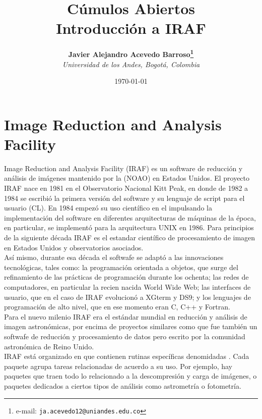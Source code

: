 \documentclass[12pt]{article}
\begin{document}
\title{Cúmulos Abiertos \\ Introducción a IRAF}

\author{
\textbf{Javier Alejandro Acevedo Barroso\thanks{e-mail: \texttt{ja.acevedo12@uniandes.edu.co}}}\\
\textit{Universidad de los Andes, Bogotá, Colombia}\\
 }%

\date{\today}
\maketitle %


\normalsize
\newpage





\section{Image Reduction and Analysis Facility}
Image Reduction and Analysis Facility (IRAF) es un software de reducción y análisis de imágenes mantenido por la  (NOAO) en Estados Unidos. El proyecto IRAF nace en 1981 en el Observatorio Nacional Kitt Peak, en donde de 1982 a 1984 se escribió la primera versión del software y su lenguaje de script para el usuario  (CL). En 1984 empezó su uso científico en el  impulsando la implementación del software en diferentes arquitecturas de máquinas de la época, en particular, se implementó para la arquitectura UNIX en 1986. Para principios de la siguiente década IRAF es el estandar científico de procesamiento de imagen en Estados Unidos y observatorios asociados\cite{IRAFinThe80}. \\
Así mismo, durante esa década el softwafe se adaptó a las innovaciones tecnológicas, tales como: la programación orientada a objetos, que surge del refinamiento de las prácticas de programación durante los ochenta; las redes de computadores, en particular la recien nacida World Wide Web; las interfaces de usuario, que en el caso de IRAF evolucionó a XGterm y DS9; y los lenguajes de programación de alto nivel, que en ese momento eran C, C++ y Fortran\cite{IRAFinThe90}.\\
Para el nuevo milenio IRAF era el estándar mundial en reducción y análisis de imagen astronómicas, por encima de proyectos similares como  que fue también un softwafe de reducción y procesamiento de datos pero escrito por la comunidad astronómica de Reino Unido.\\
IRAF está organizado en  que contienen rutinas específicas denomidadas . Cada paquete agrupa tareas relacionadas de acuerdo a su uso. Por ejemplo, hay paquetes que traen todo lo relacionado a la descompresión y carga de imágenes, o paquetes dedicados a ciertos tipos de análisis como astrometría o fotometría.
\end{document}
